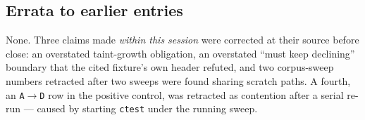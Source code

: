 \subsection*{Errata to earlier entries}
None. Three claims made \emph{within this session} were corrected at their source before close:
an overstated taint-growth obligation, an overstated ``must keep declining'' boundary that the
cited fixture's own header refuted, and two corpus-sweep numbers retracted after two sweeps were
found sharing scratch paths. A fourth, an \texttt{A\(\to\)D} row in the positive control, was
retracted as contention after a serial re-run --- caused by starting \texttt{ctest} under the
running sweep.
